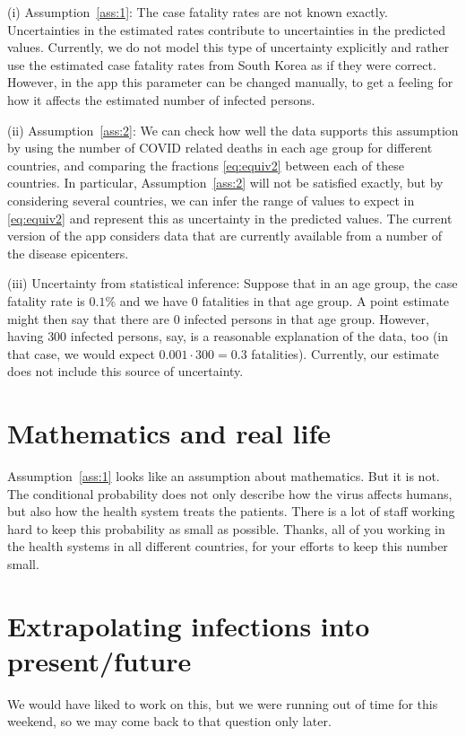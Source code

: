 \documentclass[a4paper]{article}
\begin{document}
(i) Assumption~\ref{ass:1}: The case fatality rates are not known
exactly. Uncertainties in the estimated rates contribute to
uncertainties in the predicted values. Currently, we do not model this
type of uncertainty explicitly and rather use the estimated case
fatality rates from South Korea as if they were correct. However, in
the app this parameter can be changed manually, to get a feeling for
how it affects the estimated number of infected persons.

(ii) Assumption~\ref{ass:2}: We can check 
how well the data supports 
this assumption by using 
the number of COVID related deaths in each age group for different countries, 
and comparing the fractions \eqref{eq:equiv2} between each of these countries.
In particular, Assumption~\ref{ass:2} will not be satisfied exactly, but 
by considering several countries, we can 
infer the range of values to expect in \eqref{eq:equiv2}
and represent this as uncertainty in the predicted values. 
The current version of the app considers data that are currently available from a number of the disease epicenters.

(iii) Uncertainty from statistical inference: 
Suppose that in an age group, the case fatality rate is $0.1\%$ and we have 
$0$ fatalities in that age group.
A point estimate might then say that there are $0$ infected persons
in that age group. However, having $300$ infected persons, say,
is a reasonable explanation of the data, too (in that case, we would expect $0.001\cdot 300 = 0.3$ fatalities).
Currently, our estimate does not include this source of uncertainty.


\section{Mathematics and real life}
Assumption~\ref{ass:1} looks like an assumption about mathematics. 
But it is not. 
The conditional probability does not 
only describe how
the virus affects humans, 
but also how the health system treats the patients. 
There is a lot of staff working hard to 
keep this probability as small as possible. 
Thanks, all of you working in the health systems in all different countries, for 
your efforts to keep this number small. 




\section{Extrapolating infections into present/future}
We would have liked to work on this, but we were running out of time for this weekend, so we may come back to that question only later.
\end{document}
